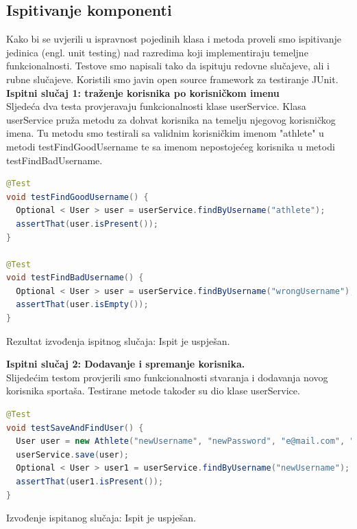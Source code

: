 			\subsection{Ispitivanje komponenti}
			Kako bi se uvjerili u ispravnost pojedinih klasa i metoda proveli smo ispitivanje jedinica (engl. unit testing) nad razredima koji implementiraju temeljne funkcionalnosti. Testove smo napisali tako da ispituju redovne slučajeve, ali i rubne slučajeve.
			Koristili smo javin open source framework za testiranje JUnit.\\
			
			\noindent\textbf{Ispitni slučaj 1: traženje korisnika po korisničkom imenu}\\
			Sljedeća dva testa provjeravaju funkcionalnosti klase userService.
			Klasa userService pruža metodu za dohvat korisnika na temelju njegovog korisničkog imena.
			Tu metodu smo testirali sa validnim korisničkim imenom "athlete" u metodi testFindGoodUsername te sa imenom nepostojećeg korisnika u metodi
			 testFindBadUsername.
			 
			 \begin{lstlisting}[language=Java,caption={findByUsername},label=DescriptiveLabel]
@Test
void testFindGoodUsername() {
  Optional < User > user = userService.findByUsername("athlete");
  assertThat(user.isPresent());
}

@Test
void testFindBadUsername() {
  Optional < User > user = userService.findByUsername("wrongUsername");
  assertThat(user.isEmpty());
}
			 \end{lstlisting}
		
			\noindent Rezultat izvođenja ispitnog slučaja: Ispit je uspješan.

			
			
			\hfill\break
			\noindent\textbf{Ispitni slučaj 2: Dodavanje i spremanje korisnika.}\\
			Slijedećim testom provjerili smo funkcionalnosti stvaranja i dodavanja novog korisnika sportaša. Testirane metode također su dio klase userService.
			
			\begin{lstlisting}[language=Java,caption={testSaveAndFindUser},label=DescriptiveLabel]
@Test
void testSaveAndFindUser() {
  User user = new Athlete("newUsername", "newPassword", "e@mail.com", "name", "surname");
  userService.save(user);
  Optional < User > user1 = userService.findByUsername("newUsername");
  assertThat(user1.isPresent());
}

			\end{lstlisting}
			\noindent Izvođenje ispitanog slučaja: Ispit je uspješan.
			
